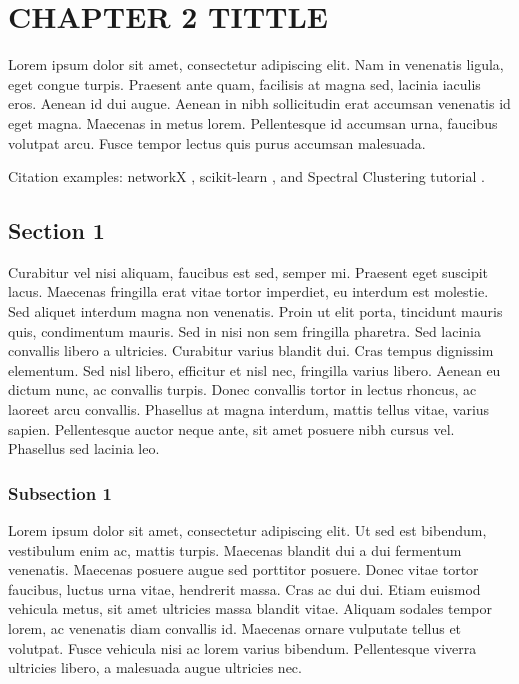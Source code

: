 \chapter{CHAPTER 2 TITTLE}
\label{ch:relatedwork}

Lorem ipsum dolor sit amet, consectetur adipiscing elit. Nam in venenatis ligula, eget congue turpis. Praesent ante quam, facilisis at magna sed, lacinia iaculis eros. Aenean id dui augue. Aenean in nibh sollicitudin erat accumsan venenatis id eget magna. Maecenas in metus lorem. Pellentesque id accumsan urna, faucibus volutpat arcu. Fusce tempor lectus quis purus accumsan malesuada.

Citation examples: networkX \cite{SciPyProceedings_11}, scikit-learn \cite{scikit-learn}, and Spectral Clustering tutorial \cite{von2007tutorial}.


\section*{Section 1} 

Curabitur vel nisi aliquam, faucibus est sed, semper mi. Praesent eget suscipit lacus. Maecenas fringilla erat vitae tortor imperdiet, eu interdum est molestie. Sed aliquet interdum magna non venenatis. Proin ut elit porta, tincidunt mauris quis, condimentum mauris. Sed in nisi non sem fringilla pharetra. Sed lacinia convallis libero a ultricies. Curabitur varius blandit dui. Cras tempus dignissim elementum. Sed nisl libero, efficitur et nisl nec, fringilla varius libero. Aenean eu dictum nunc, ac convallis turpis. Donec convallis tortor in lectus rhoncus, ac laoreet arcu convallis. Phasellus at magna interdum, mattis tellus vitae, varius sapien. Pellentesque auctor neque ante, sit amet posuere nibh cursus vel. Phasellus sed lacinia leo. 


\subsection*{Subsection 1} 


Lorem ipsum dolor sit amet, consectetur adipiscing elit. Ut sed est bibendum, vestibulum enim ac, mattis turpis. Maecenas blandit dui a dui fermentum venenatis. Maecenas posuere augue sed porttitor posuere. Donec vitae tortor faucibus, luctus urna vitae, hendrerit massa. Cras ac dui dui. Etiam euismod vehicula metus, sit amet ultricies massa blandit vitae. Aliquam sodales tempor lorem, ac venenatis diam convallis id. Maecenas ornare vulputate tellus et volutpat. Fusce vehicula nisi ac lorem varius bibendum. Pellentesque viverra ultricies libero, a malesuada augue ultricies nec.

